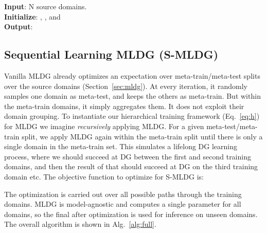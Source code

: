 \documentclass[runningheads]{llncs}
\newcommand{\nameS}{S-MLDG}
\begin{document}
\begin{algorithm}[t]
\SetAlgoLined
\textbf{Input}: N source domains.\\
\textbf{Initialize}: ,  , and  \\
 \textbf{Output}: \ 
 \caption{\nameS: Sequential Learning MLDG}
 \label{alg:full}
\end{algorithm}





\subsection{Sequential Learning MLDG (\nameS)}
Vanilla MLDG already optimizes an expectation over meta-train/meta-test splits over the source domains (Section~\ref{sec:mldg}). At every iteration, it randomly samples one domain as meta-test, and keeps the others as meta-train. But within the meta-train domains, it simply aggregates them. It does not exploit their domain grouping. To instantiate our hierarchical training framework (Eq.~\ref{eq:h}) for MLDG we imagine \emph{recursively} applying MLDG. For a given meta-test/meta-train split, we apply MLDG again within the meta-train split until there is only a single domain in the meta-train set. This simulates a lifelong DG learning process, where we should succeed at DG between the first and second training domains, and then the result of that should succeed at DG on the third training domain etc. The objective function to optimize for \nameS{} is:
\small

\normalsize
The optimization is carried out over all possible paths  through the training domains.  MLDG is model-agnostic and computes a single parameter  for all domains, so the final  after optimization is used for inference on unseen domains. The overall algorithm is shown in Alg.~\ref{alg:full}.
\end{document}
